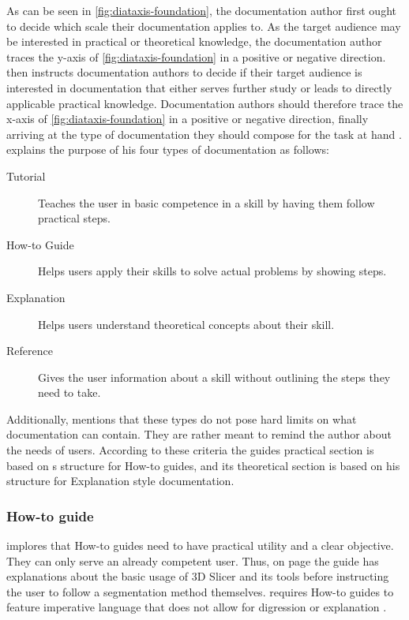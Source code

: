 \noindent
As can be seen in \cref{fig:diataxis-foundation}, the documentation author first ought to decide which scale their documentation applies to.
As the target audience may be interested in practical or theoretical knowledge, the documentation author traces the y-axis of \cref{fig:diataxis-foundation} in a positive or negative direction.
\citeauthor{procidaDiataxisDocumentationFramework2023} then instructs documentation authors to decide if their target audience is interested in documentation that either serves further study or leads to directly applicable practical knowledge.
Documentation authors should therefore trace the x-axis of \cref{fig:diataxis-foundation} in a positive or negative direction, finally arriving at the type of documentation they should compose for the task at hand \cite{procidaPythonDocsCommunity2022}.
\citeauthor{procidaDiataxisDocumentationFramework2023} explains the purpose of his four types of documentation as follows:
\begin{description}
	\item[Tutorial] Teaches the user in basic competence in a skill by having them follow practical steps.
	\item[How-to Guide] Helps users apply their skills to solve actual problems by showing steps.
	\item[Explanation] Helps users understand theoretical concepts about their skill.
	\item[Reference] Gives the user information about a skill without outlining the steps they need to take.
\end{description}
Additionally, \citeauthor{procidaDiataxisDocumentationFramework2023} mentions that these types do not pose hard limits on what documentation can contain. They are rather meant to remind the author about the needs of users.
According to these criteria the guides practical section is based on \citeauthor{procidaDiataxisDocumentationFramework2023}s structure for How-to guides, and its theoretical section is based on his structure for Explanation style documentation.

\subsubsection*{How-to guide} %
\citeauthor{procidaDiataxisDocumentationFramework2023} implores that How-to guides need to have practical utility and a clear objective.
They can only serve an already competent user.
Thus, on page \pageref{a:guide} the guide has explanations about the basic usage of 3D Slicer and its tools before instructing the user to follow a segmentation method themselves.
\citeauthor{procidaDiataxisDocumentationFramework2023} requires How-to guides to feature imperative language that does not allow for digression or explanation \cite{procidaPythonDocsCommunity2022,procidaDiataxisDocumentationFramework2023}.

